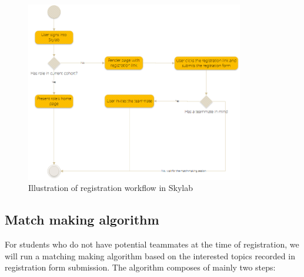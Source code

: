 \begin{figure}[h]
  \centering
  \includegraphics[width=0.85\textwidth]{Images/Skylab_Registration_Workflow.png}
  \caption{Illustration of registration workflow in Skylab}
  \label{fig:RegistrationWorkflow}
\end{figure}

\subsection{Match making algorithm}

For students who do not have potential teammates at the time of registration, we will run a matching making algorithm based on the interested topics recorded in registration form submission. The algorithm composes of mainly two steps:

